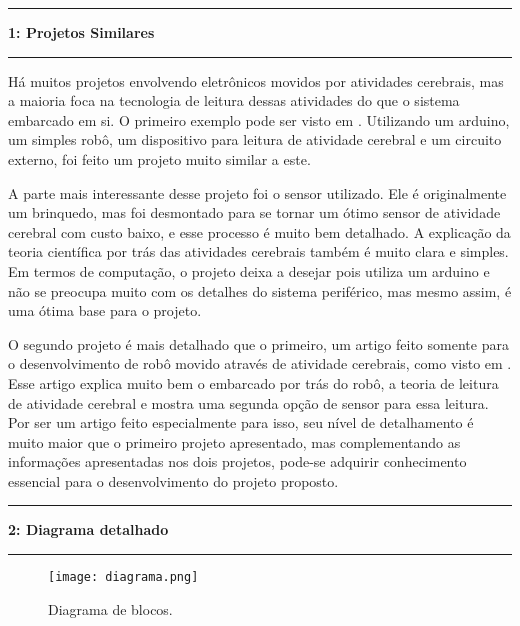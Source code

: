 \documentclass[11pt]{article}
\newcommand\question[2]{\vspace{.25in}\hrule\textbf{#1: #2}\vspace{.5em}\hrule\vspace{.10in}}
\begin{document}
\raggedright
\newcommand\NAME{Marcelo G de Andrade}  %
\newcommand\HWNUM{1}              %


\question{1}{Projetos Similares}

\RaggedRight
Há muitos projetos envolvendo eletrônicos movidos por atividades cerebrais, mas a maioria foca na tecnologia de leitura dessas atividades do que o sistema embarcado em si. O primeiro exemplo pode ser visto em \cite{brainwaves_project}. Utilizando um arduino, um simples robô, um dispositivo para leitura de atividade cerebral e um circuito externo, foi feito um projeto muito similar a este.

A parte mais interessante desse projeto foi o sensor utilizado. Ele é originalmente um brinquedo, mas foi desmontado para se tornar um ótimo sensor de atividade cerebral com custo baixo, e esse processo é muito bem detalhado. A explicação da teoria científica por trás das atividades cerebrais também é muito clara e simples. Em termos de computação, o projeto deixa a desejar pois utiliza um arduino e não se preocupa muito com os detalhes do sistema periférico, mas mesmo assim, é uma ótima base para o projeto.

O segundo projeto é mais detalhado que o primeiro, um artigo feito somente para o desenvolvimento de robô movido através de atividade cerebrais, como visto em \cite{make_mind_controlled}. Esse artigo explica muito bem o embarcado por trás do robô, a teoria de leitura de atividade cerebral e mostra uma segunda opção de sensor para essa leitura. Por ser um artigo feito especialmente para isso, seu nível de detalhamento é muito maior que o primeiro projeto apresentado, mas complementando as informações apresentadas nos dois projetos, pode-se adquirir conhecimento essencial para o desenvolvimento do projeto proposto.

\raggedright
\question{2}{Diagrama detalhado}

\begin{figure}[h!]
	\centering
	\texttt{[image: diagrama.png]}
	\caption{Diagrama de blocos.}
\end{figure}
\end{document}
